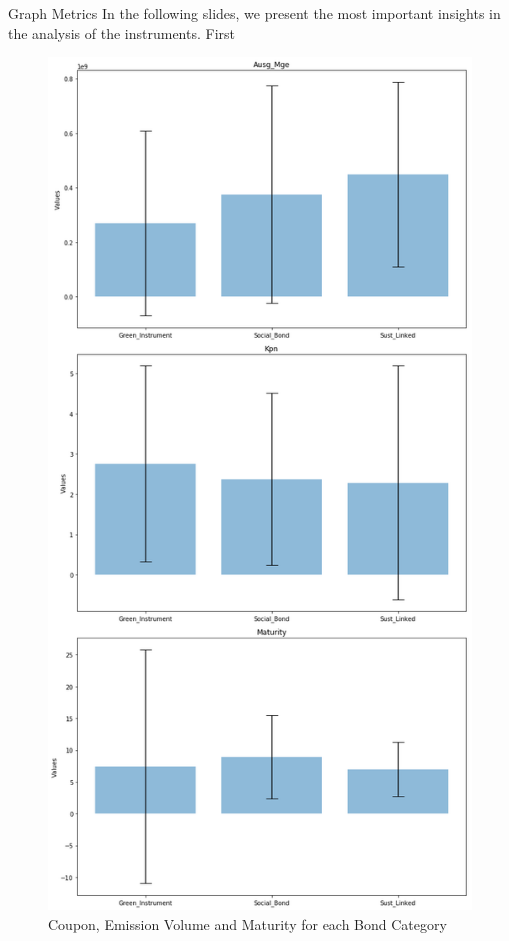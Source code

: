 \documentclass[
	8pt, %
]{beamer}
\begin{document}
\begin{frame}{Graph Metrics}
In the following slides, we present the most important insights in the analysis of the instruments. First
    \begin{figure}[H]
    \centering
    \includegraphics[width=0.8\linewidth, height=0.8\textheight, keepaspectratio]{Metrics_per_Bond.png}
    \caption{Coupon, Emission Volume and Maturity for each Bond Category}
\label{fig:Metrics}
\end{figure}
\end{frame}
\end{document}
